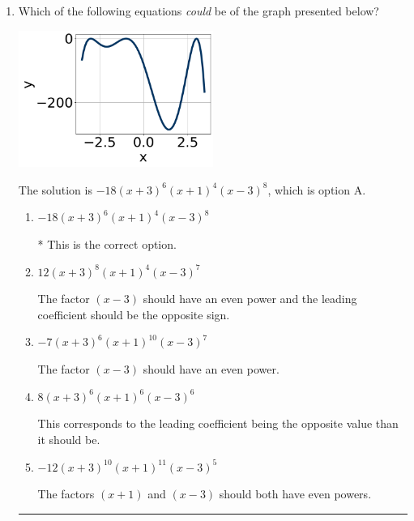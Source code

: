 \documentclass{extbook}[14pt]
\newcommand{\litem}[1]{\item #1

\rule{\textwidth}{0.4pt}}
\begin{document}
\begin{enumerate}\litem{
Which of the following equations \textit{could} be of the graph presented below?

\begin{center}
    \includegraphics[width=0.5\textwidth]{../Figures/polyGraphToFunctionA.png}
\end{center}


The solution is \( -18(x + 3)^{6} (x + 1)^{4} (x - 3)^{8} \), which is option A.\begin{enumerate}[label=\Alph*.]
\item \( -18(x + 3)^{6} (x + 1)^{4} (x - 3)^{8} \)

* This is the correct option.
\item \( 12(x + 3)^{8} (x + 1)^{4} (x - 3)^{7} \)

The factor $(x - 3)$ should have an even power and the leading coefficient should be the opposite sign.
\item \( -7(x + 3)^{6} (x + 1)^{10} (x - 3)^{7} \)

The factor $(x - 3)$ should have an even power.
\item \( 8(x + 3)^{6} (x + 1)^{6} (x - 3)^{6} \)

This corresponds to the leading coefficient being the opposite value than it should be.
\item \( -12(x + 3)^{10} (x + 1)^{11} (x - 3)^{5} \)

The factors $(x + 1)$ and $(x - 3)$ should both have even powers.
\end{enumerate}

}
\end{enumerate}
\end{document}
